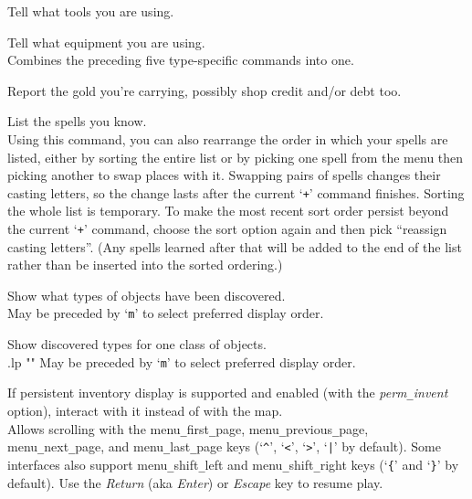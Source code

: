 Tell what tools you are using.
\item[\tb{*}]
Tell what equipment you are using.\\
Combines the preceding five type-specific
commands into one.
\item[\tb{\$}]
Report the gold you're carrying, possibly shop credit and/or debt too.
\item[\tb{+}]
List the spells you know.\\
Using this command, you can also rearrange
the order in which your spells are listed, either by sorting the entire
list or by picking one spell from the menu then picking another to swap
places with it.  Swapping pairs of spells changes their casting letters,
so the change lasts after the current `{\tt +}' command finishes.  Sorting
the whole list is temporary.  To make the most recent sort order persist
beyond the current `{\tt +}' command, choose the sort option again and then
pick ``reassign casting letters''.  (Any spells learned after that will
be added to the end of the list rather than be inserted into the sorted
ordering.)
\item[\tb{$\backslash$}]
Show what types of objects have been discovered.
\\
May be preceded by `{\tt m}' to select preferred display order.
\item[\tb{\`}]
Show discovered types for one class of objects.
\\
.lp ""
May be preceded by `{\tt m}' to select preferred display order.

\item[\tb{|}]
If persistent inventory display is supported and enabled (with the
{\it perm\verb+_+invent\/}
option), interact with it instead of with the map.
\\
Allows scrolling with the
menu\verb+_+first\verb+_+page, menu\verb+_+previous\verb+_+page,
menu\verb+_+next\verb+_+page, and menu\verb+_+last\verb+_+page
keys (`{\tt \^{}}', `{\tt <}', `{\tt >}', `{\tt \verb+|+}' by default).
Some interfaces also support menu\verb+_+shift\verb+_+left and menu\verb+_+shift\verb+_+right
keys (`{\tt \verb+{+}' and `{\tt \verb+}+}' by default).
Use the {\it Return\/} (aka {\it Enter\/}) or {\it Escape\/} key to
resume play.

